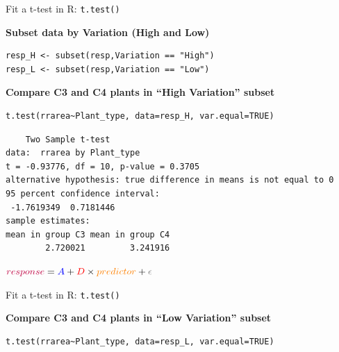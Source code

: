 \documentclass{beamer}
\makeatletter
\newenvironment{kframe}{%
 \def\at@end@of@kframe{}%
 \ifinner\ifhmode%
  \def\at@end@of@kframe{\end{minipage}}%
  \begin{minipage}{\columnwidth}%
 \fi\fi%
 \def\FrameCommand##1{\hskip\@totalleftmargin \hskip-\fboxsep
 \colorbox{shadecolor}{##1}\hskip-\fboxsep
     \hskip-\linewidth \hskip-\@totalleftmargin \hskip\columnwidth}%
 \MakeFramed {\advance\hsize-\width
   \@totalleftmargin\z@ \linewidth\hsize
   \@setminipage}}%
 {\par\unskip\endMakeFramed%
 \at@end@of@kframe}
\newenvironment{knitrout}{}{} %
\makeatother
\begin{document}
\begin{frame}[fragile]{Fit a t-test in R: \texttt{t.test()}}

\textbf{Subset data by Variation (High and Low)}

\begin{knitrout}
\color{fgcolor}\begin{kframe}
\begin{verbatim}
resp_H <- subset(resp,Variation == "High")
resp_L <- subset(resp,Variation == "Low")
\end{verbatim}
\end{kframe}
\end{knitrout}

\pause

\textbf{Compare C3 and C4 plants in “High Variation” subset}
\begin{knitrout}
\color{fgcolor}\begin{kframe}
\begin{verbatim}
t.test(rrarea~Plant_type, data=resp_H, var.equal=TRUE)
\end{verbatim}
\end{kframe}
\end{knitrout}

\pause
\begin{knitrout}
\color{fgcolor}\begin{kframe}
\small
\begin{verbatim}
	Two Sample t-test
data:  rrarea by Plant_type
t = -0.93776, df = 10, p-value = 0.3705
alternative hypothesis: true difference in means is not equal to 0
95 percent confidence interval:
 -1.7619349  0.7181446
sample estimates:
mean in group C3 mean in group C4 
        2.720021         3.241916 
\end{verbatim}
\end{kframe}
\end{knitrout}

\pause
${\color{purple}{response}} = {\color{blue}{A}} + {\color{red}{D}} \times {\color{orange}{predictor}} + {\color{gray}{\epsilon}}$

\end{frame}

\begin{frame}[fragile]{Fit a t-test in R: \texttt{t.test()}}

\textbf{Compare C3 and C4 plants in “Low Variation” subset}
\begin{knitrout}
\color{fgcolor}\begin{kframe}
\begin{verbatim}
t.test(rrarea~Plant_type, data=resp_L, var.equal=TRUE)
\end{verbatim}
\end{kframe}
\end{knitrout}

\end{frame}
\end{document}
